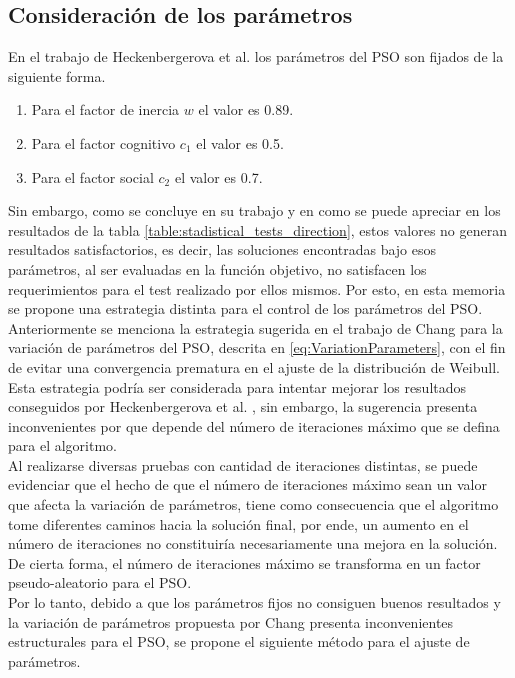 \subsection{Consideración de los parámetros}
En el trabajo de Heckenbergerova et al. \cite{Heckenbergerova15} los parámetros del PSO son fijados de la siguiente forma.
\begin{enumerate}
  \item Para el factor de inercia $w$ el valor es 0.89.
  \item Para el factor cognitivo $c_1$ el valor es 0.5.
  \item Para el factor social $c_2$ el valor es 0.7.
\end{enumerate}
Sin embargo, como se concluye en su trabajo y en como se puede apreciar en los resultados de la tabla \ref{table:stadistical_tests_direction}, estos valores no generan resultados satisfactorios, es decir, las soluciones encontradas bajo esos parámetros, al ser evaluadas en la función objetivo, no satisfacen los requerimientos para el test realizado por ellos mismos. Por esto, en esta memoria se propone una estrategia distinta para el control de los parámetros del PSO.\\ 
Anteriormente se menciona la estrategia sugerida en el trabajo de Chang \cite{Chang10_2} para la variación de parámetros del PSO, descrita en \ref{eq:VariationParameters}, con el fin de evitar una convergencia prematura en el ajuste de la distribución de Weibull. Esta estrategia podría ser considerada para intentar mejorar los resultados conseguidos por Heckenbergerova et al. \cite{Heckenbergerova15}, sin embargo, la sugerencia presenta inconvenientes por que depende del número de iteraciones máximo que se defina para el algoritmo.\\
Al realizarse diversas pruebas con cantidad de iteraciones distintas, se puede evidenciar que el hecho de que el número de iteraciones máximo sean un valor que afecta la variación de parámetros, tiene como consecuencia que el algoritmo tome diferentes caminos hacia la solución final, por ende, un aumento en el número de iteraciones no constituiría necesariamente una mejora en la solución. De cierta forma, el número de iteraciones máximo se transforma en un factor pseudo-aleatorio para el PSO.\\
Por lo tanto, debido a que los parámetros fijos no consiguen buenos resultados y la variación de parámetros propuesta por Chang \cite{Chang10_2} presenta inconvenientes estructurales para el PSO, se propone el siguiente método para el ajuste de parámetros.\\
